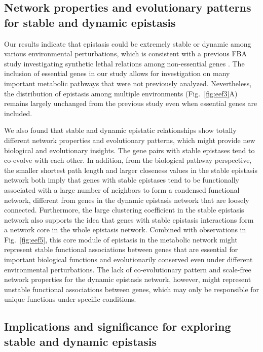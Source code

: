 \documentclass[10pt]{article}
\newcommand{\Fig}{Fig.}
\newcommand{\citep}{\cite}
\begin{document}
\subsection*{Network properties and evolutionary patterns for stable
and dynamic epistasis}

Our results indicate that epistasis could be extremely stable or
dynamic among various environmental perturbations, which is consistent
with a previous FBA study investigating synthetic lethal relations
among non-essential genes \citep{Harrison2007}. The inclusion of
essential genes in our study allows for investigation on many
important metabolic
pathways that were not previously analyzed. Nevertheless, the
distribution of epistasis among multiple environments (\Fig~\ref{fig:eef3}A)
remains largely unchanged from the previous study \citep{Harrison2007}
even when essential genes are included.

We also found that stable and dynamic epistatic relationships show
totally different network properties and evolutionary patterns, which
might provide new biological and evolutionary insights. The gene pairs
with stable epistases tend to co-evolve with each other. In addition,
from the biological pathway perspective, the smaller shortest path
length and larger closeness values in the stable epistasis network
both imply that genes with stable epistases tend to be functionally
associated with a large number of neighbors to form a condensed
functional network, different from genes in the dynamic epistasis
network that are loosely connected. Furthermore, the large clustering
coefficient in the stable epistasis network also supports the idea
that genes with stable epistasis interactions form a network core in
the whole epistasis network. Combined with observations in \Fig~\ref{fig:eef5},
this core module of epistasis in the metabolic network might represent
stable functional associations between genes that are essential for
important biological functions and evolutionarily conserved even under
different environmental perturbations. The lack of co-evolutionary
pattern and scale-free network properties for the dynamic epistasis
network, however, might represent unstable functional associations
between genes, which may only be responsible for unique functions
under specific conditions.

\subsection*{Implications and significance for exploring stable and
dynamic epistasis}
\end{document}
